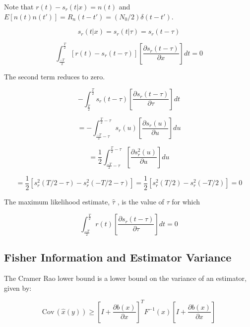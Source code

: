 \documentclass[11pt]{article}
\def\Cov{{\textrm{Cov}}\,}
\begin{document}
Note that $r(t) - s_r(t|x) = n(t)$ and $E[n(t)n(t')]=R_n(t-t')=(N_0/2)\delta(t-t')$.

\begin{equation}
s_r(t|x) = s_r(t|\tau) = s_r(t-\tau)
\end{equation}


\begin{equation}
\int^\frac{T}{2}_\frac{-T}{2}
 \left[ r(t) - s_r(t-\tau)\right]
\left[ \frac{\partial s_r(t-\tau)}{\partial x} \right] dt = 0
\end{equation}

The second term reduces to zero.

\begin{equation}
- \int^\frac{T}{2}_\frac{T}{2}
s_r(t-\tau)
\left[ \frac{\partial s_r(t-\tau)}{\partial \tau} \right] dt
\end{equation}


\begin{equation}
=-\int^{\frac{T}{2}-\tau}_{\frac{-T}{2}-\tau}
s_r(u)
\left[ \frac{\partial s_r(u)}{\partial u} \right] du
\end{equation}

\begin{equation}
=\frac{1}{2} \int^{\frac{T}{2}-\tau}_{\frac{-T}{2}-\tau}
\left[ \frac{\partial s_r^2(u)}{\partial u} \right] du
\end{equation}

\begin{equation}
=\frac{1}{2}[s_r^2(T/2-\tau) - s_r^2(-T/2-\tau)] = \frac{1}{2}[s_r^2(T/2) - s_r^2(-T/2)] = 0
\end{equation}

The maximum likelihood estimate, $\hat{\tau}$ , is the value of $\tau$ for which

\begin{equation}
\int^\frac{T}{2}_\frac{-T}{2}
r(t)
\left[ \frac{\partial s_r(t-\tau)}{\partial \tau} \right] dt = 0
\end{equation}


\subsection{Fisher Information and Estimator Variance}


The Cramer Rao lower bound is a lower bound on the variance of an estimator, given by:

\begin{equation}
\Cov(\hat{x}(y))
\geq
\left[I + \frac{\partial b(x)}{\partial x}\right]^T F^{-1}(x) \left[I + \frac{\partial b(x)}{\partial x}\right]
\end{equation}
\end{document}
